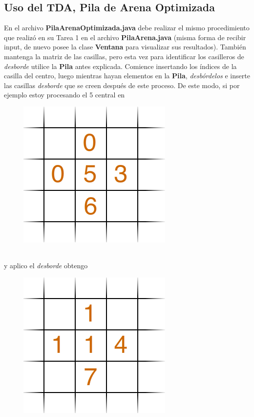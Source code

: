 \documentclass[dcc]{fcfmcourse}
\begin{document}
\subsection{Uso del TDA, Pila de Arena Optimizada}
En el archivo \textbf{PilaArenaOptimizada.java} debe realizar el mismo procedimiento que realizó en su Tarea 1 en el archivo \textbf{PilaArena.java} (misma forma de recibir input, de nuevo posee la clase \textbf{Ventana} para visualizar sus resultados). También mantenga la matriz de las casillas, pero esta vez para identificar los casilleros de \textit{desborde} utilice la \textbf{Pila} antes explicada. Comience insertando los índices de la casilla del centro, luego mientras hayan elementos en la \textbf{Pila}, \textit{desbórdelos} e inserte las casillas \textit{desborde} que se creen después de este proceso. De este modo, si por ejemplo estoy procesando el 5 central en
\begin{figure}[!ht]
    \centering
    \includegraphics[scale=0.45]{imagenes/gridex3.png}
\end{figure}
\\y aplico el \textit{desborde} obtengo
\begin{figure}[!ht]
    \centering
    \includegraphics[scale=0.45]{imagenes/gridex4.png}
\end{figure}
\end{document}
